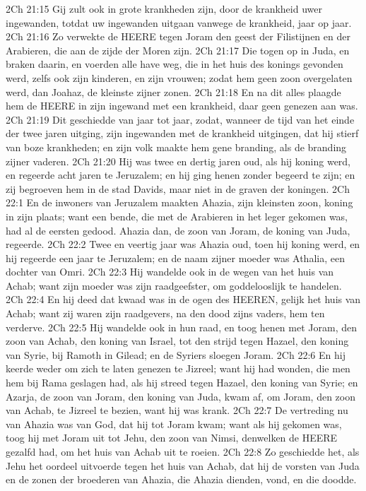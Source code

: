 2Ch 21:15  Gij zult ook in grote krankheden zijn, door de krankheid uwer ingewanden, totdat uw ingewanden uitgaan vanwege de krankheid, jaar op jaar.
2Ch 21:16  Zo verwekte de HEERE tegen Joram den geest der Filistijnen en der Arabieren, die aan de zijde der Moren zijn.
2Ch 21:17  Die togen op in Juda, en braken daarin, en voerden alle have weg, die in het huis des konings gevonden werd, zelfs ook zijn kinderen, en zijn vrouwen; zodat hem geen zoon overgelaten werd, dan Joahaz, de kleinste zijner zonen.
2Ch 21:18  En na dit alles plaagde hem de HEERE in zijn ingewand met een krankheid, daar geen genezen aan was.
2Ch 21:19  Dit geschiedde van jaar tot jaar, zodat, wanneer de tijd van het einde der twee jaren uitging, zijn ingewanden met de krankheid uitgingen, dat hij stierf van boze krankheden; en zijn volk maakte hem gene branding, als de branding zijner vaderen.
2Ch 21:20  Hij was twee en dertig jaren oud, als hij koning werd, en regeerde acht jaren te Jeruzalem; en hij ging henen zonder begeerd te zijn; en zij begroeven hem in de stad Davids, maar niet in de graven der koningen.
2Ch 22:1  En de inwoners van Jeruzalem maakten Ahazia, zijn kleinsten zoon, koning in zijn plaats; want een bende, die met de Arabieren in het leger gekomen was, had al de eersten gedood. Ahazia dan, de zoon van Joram, de koning van Juda, regeerde.
2Ch 22:2  Twee en veertig jaar was Ahazia oud, toen hij koning werd, en hij regeerde een jaar te Jeruzalem; en de naam zijner moeder was Athalia, een dochter van Omri.
2Ch 22:3  Hij wandelde ook in de wegen van het huis van Achab; want zijn moeder was zijn raadgeefster, om goddelooslijk te handelen.
2Ch 22:4  En hij deed dat kwaad was in de ogen des HEEREN, gelijk het huis van Achab; want zij waren zijn raadgevers, na den dood zijns vaders, hem ten verderve.
2Ch 22:5  Hij wandelde ook in hun raad, en toog henen met Joram, den zoon van Achab, den koning van Israel, tot den strijd tegen Hazael, den koning van Syrie, bij Ramoth in Gilead; en de Syriers sloegen Joram.
2Ch 22:6  En hij keerde weder om zich te laten genezen te Jizreel; want hij had wonden, die men hem bij Rama geslagen had, als hij streed tegen Hazael, den koning van Syrie; en Azarja, de zoon van Joram, den koning van Juda, kwam af, om Joram, den zoon van Achab, te Jizreel te bezien, want hij was krank.
2Ch 22:7  De vertreding nu van Ahazia was van God, dat hij tot Joram kwam; want als hij gekomen was, toog hij met Joram uit tot Jehu, den zoon van Nimsi, denwelken de HEERE gezalfd had, om het huis van Achab uit te roeien.
2Ch 22:8  Zo geschiedde het, als Jehu het oordeel uitvoerde tegen het huis van Achab, dat hij de vorsten van Juda en de zonen der broederen van Ahazia, die Ahazia dienden, vond, en die doodde.

